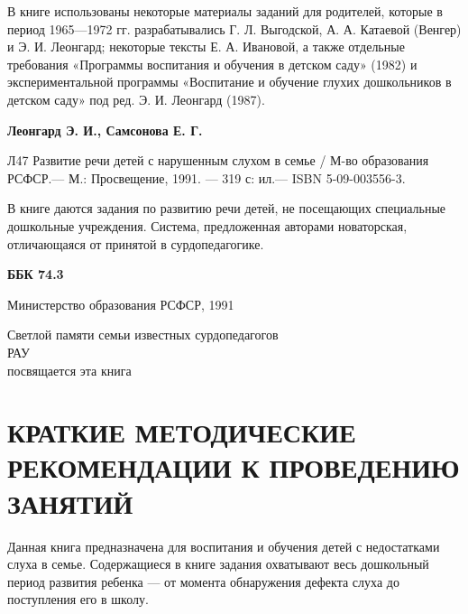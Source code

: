 \documentclass{book}
\begin{document}
\thispagestyle{plain}
\hspace{\parindent}

\pagebreak
\thispagestyle{plain}


В книге использованы некоторые материалы заданий для родителей, которые
в период 1965---1972 гг. разрабатывались Г. Л. Выгодской, А. А. Катаевой
(Венгер) и Э. И. Леонгард; некоторые тексты Е. А. Ивановой, а также
отдельные требования «Программы воспитания и обучения в детском саду»
(1982) и экспериментальной программы «Воспитание и обучение глухих
дошкольников в детском саду» под ред. Э. И. Леонгард (1987).

\vspace{5\parindent}

\textbf{Леонгард Э. И., Самсонова Е. Г.}

Л47\hspace{\parindent} Развитие речи детей с нарушенным слухом в семье /
М-во образования РСФСР.--- М.: Просвещение, 1991. ---
319 с: ил.--- ISBN 5-09-003556-3.

В книге даются задания по развитию речи детей, не посещающих специальные
дошкольные учреждения. Система, предложенная авторами новаторская,
отличающаяся от принятой в сурдопедагогике. \\

\vfill

\textbf{ББК 74.3}

\textcopyright Министерство образования РСФСР, 1991

\pagebreak
\pagestyle{mainstyle}

\hfill \begin{minipage}[c]{0.3\textwidth} \small {\raggedleft
Светлой памяти семьи известных 
сурдопедагогов} \\
РАУ  \\ 
{\raggedleft посвящается эта книга}
\end{minipage}

\section{КРАТКИЕ МЕТОДИЧЕСКИЕ РЕКОМЕНДАЦИИ К ПРОВЕДЕНИЮ ЗАНЯТИЙ}

Данная книга предназначена для воспитания и обучения детей с
недостатками слуха в семье. Содержащиеся в книге задания охватывают весь
дошкольный период развития ребенка --- от момента обнаружения дефекта
слуха до поступления его в школу.
\end{document}
